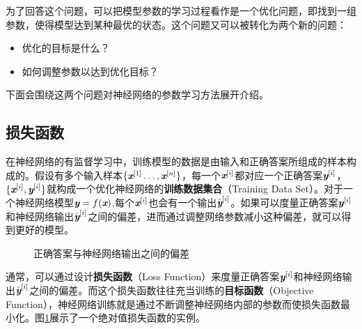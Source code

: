 \parinterval 为了回答这个问题，可以把模型参数的学习过程看作是一个优化问题，即找到一组参数，使得模型达到某种最优的状态。这个问题又可以被转化为两个新的问题：

\begin{itemize}
\vspace{0.5em}
\item 优化的目标是什么？
\vspace{0.5em}
\item 如何调整参数以达到优化目标？
\vspace{0.5em}
\end{itemize}

\parinterval 下面会围绕这两个问题对神经网络的参数学习方法展开介绍。


\subsection{损失函数}

\parinterval 在神经网络的有监督学习中，训练模型的数据是由输入和正确答案所组成的样本构成的。假设有多个输入样本$ \{{\textbf{\em x}}^{[1]}\dots,{\textbf{\em x}}^{[n]}\} $，每一个$ {\textbf{\em x}}^{[i]}$都对应一个正确答案$ {\textbf{\em y}}^{[i]} $，$ \{{\textbf{\em x}}^{[i]},{\textbf{\em y}}^{[i]}\} $就构成一个优化神经网络的{\small\sffamily\bfseries{训练数据集合}}（Training Data Set）。对于一个神经网络模型${\textbf{\em y}}=f({\textbf{\em x}}) $,每个$ {\textbf{\em x}}^{[i]} $也会有一个输出$ {\hat{\textbf{\em y}}}^{[i]} $。如果可以度量正确答案$ {\textbf{\em y}}^{[i]} $和神经网络输出$ {\hat{\textbf{\em y}}}^{[i]} $之间的偏差，进而通过调整网络参数减小这种偏差，就可以得到更好的模型。

\begin{figure}[htp]
\centering

\caption{正确答案与神经网络输出之间的偏差}
\label{fig:9-42}
\end{figure}

\parinterval 通常，可以通过设计{\small\sffamily\bfseries{损失函数}}（Loss Function）来度量正确答案$ {\textbf{\em y}}^{[i]} $和神经网络输出$ {\hat{\textbf{\em y}}}^{[i]} $之间的偏差。而这个损失函数往往充当训练的{\small\sffamily\bfseries{目标函数}}（Objective Function），神经网络训练就是通过不断调整神经网络内部的参数而使损失函数最小化。图\ref{fig:9-42}展示了一个绝对值损失函数的实例。

